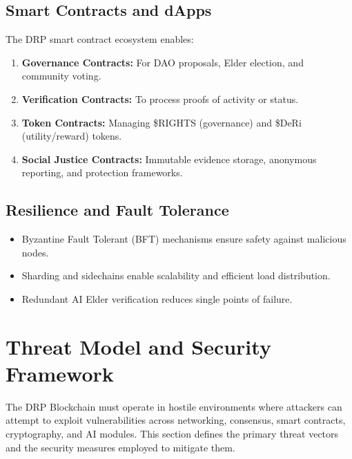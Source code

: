 \documentclass[11pt,a4paper]{article}
\begin{document}
\subsection{Smart Contracts and dApps}
The DRP smart contract ecosystem enables:
\begin{enumerate}
    \item \textbf{Governance Contracts:} For DAO proposals, Elder election, and community voting.  
    \item \textbf{Verification Contracts:} To process proofs of activity or status.  
    \item \textbf{Token Contracts:} Managing \$RIGHTS (governance) and \$DeRi (utility/reward) tokens.  
    \item \textbf{Social Justice Contracts:} Immutable evidence storage, anonymous reporting, and protection frameworks.  
\end{enumerate}

\subsection{Resilience and Fault Tolerance}
\begin{itemize}
    \item Byzantine Fault Tolerant (BFT) mechanisms ensure safety against malicious nodes.  
    \item Sharding and sidechains enable scalability and efficient load distribution.  
    \item Redundant AI Elder verification reduces single points of failure.  
\end{itemize}

\section{Threat Model and Security Framework}

The DRP Blockchain must operate in hostile environments where attackers can attempt to exploit vulnerabilities across networking, consensus, smart contracts, cryptography, and AI modules. This section defines the primary threat vectors and the security measures employed to mitigate them.
\end{document}
